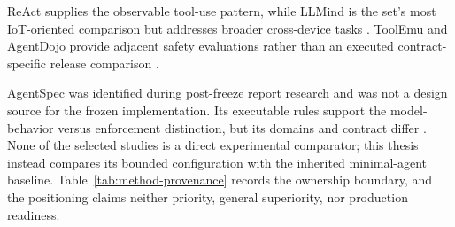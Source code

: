 ReAct supplies the observable tool-use pattern, while LLMind is the set's most
IoT-oriented comparison but addresses broader cross-device tasks
\cite{yao2023react,cui2025llmind}. ToolEmu and AgentDojo provide adjacent safety
evaluations rather than an executed contract-specific release comparison
\cite{ruan2024toolemu,debenedetti2024agentdojo}.

AgentSpec was identified during post-freeze report research and was not a design
source for the frozen implementation. Its executable rules support the
model-behavior versus enforcement distinction, but its domains and contract
differ \cite{wang2026agentspec}. None of the selected studies is a direct
experimental comparator; this thesis instead compares its bounded configuration
with the inherited minimal-agent baseline. Table~\ref{tab:method-provenance}
records the ownership boundary, and the positioning claims neither priority,
general superiority, nor production readiness.

\endgroup
